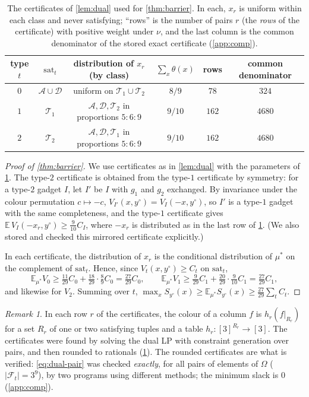 \documentclass[11pt,letterpaper]{article}
\theoremstyle{remark}
\newtheorem{remark}[theorem]{Remark}
\newcommand{\sat}{\mathrm{sat}}
\newcommand{\yc}{y^{\circ}}
\begin{document}
\begin{table}[t]
\centering\small
\begin{tabular}{@{}cccccc@{}}
\toprule
type $t$ & $\sat_t$ & distribution of $x_r$ (by class) & $\sum_x\theta(x)$ & rows & common denominator\\
\midrule
$0$ & $\mathcal A\cup\mathcal D$ & uniform on $\mathcal T_1\cup\mathcal T_2$ & $8/9$ & $78$ & $324$\\
$1$ & $\mathcal T_1$ & $\mathcal A,\mathcal D,\mathcal T_2$ in proportions $5:6:9$ & $9/10$ & $162$ & $4680$\\
$2$ & $\mathcal T_2$ & $\mathcal A,\mathcal D,\mathcal T_1$ in proportions $5:6:9$ & $9/10$ & $162$ & $4680$\\
\bottomrule
\end{tabular}
\caption{The certificates of \cref{lem:dual} used for \cref{thm:barrier}. In each, $x_r$ is uniform within
each class and never satisfying; ``rows'' is the number of pairs $r$ (the \emph{rows} of the certificate) with positive weight under $\nu$, and the last column is
the common denominator of the stored exact certificate (\cref{app:comp}).}
\label{tab:certs}
\end{table}

\begin{proof}[Proof of \cref{thm:barrier}]
We use certificates as in \cref{lem:dual} with the parameters of \cref{tab:certs}. The type-$2$
certificate is obtained from the type-$1$ certificate by symmetry: for a type-$2$ gadget $I$, let $I'$ be
$I$ with $g_1$ and $g_2$ exchanged. By invariance under the colour permutation $c\mapsto-c$,
$V_{I'}(x,\yc)=V_I(-x,\yc)$, so $I'$ is a type-$1$ gadget with the same completeness, and the type-$1$
certificate gives $\mathbb E\,V_I(-x_r,\yc)\ge\frac9{10}C_I$, where $-x_r$ is distributed as in the last row
of \cref{tab:certs}. (We also stored and checked this mirrored certificate explicitly.)

In each certificate, the distribution of $x_r$ is the conditional distribution of $\mu^\ast$ on the
complement of $\sat_t$. Hence, since $V_t(x,\yc)\ge C_t$ on $\sat_t$,
\[
\mathbb E_{\mu^\ast}V_0\ge\tfrac{11}{29}C_0+\tfrac{18}{29}\cdot\tfrac89C_0=\tfrac{27}{29}C_0,\qquad
\mathbb E_{\mu^\ast}V_1\ge\tfrac{9}{29}C_1+\tfrac{20}{29}\cdot\tfrac9{10}C_1=\tfrac{27}{29}C_1,
\]
and likewise for $V_2$. Summing over $t$, $\max_xS_{\yc}(x)\ge\mathbb E_{\mu^\ast}S_{\yc}(x)
\ge\frac{27}{29}\sum_tC_t$.
\end{proof}

\begin{remark}
In each row $r$ of the certificates, the colour of a column $f$ is $h_r(f|_{R_r})$ for a set $R_r$ of one
or two satisfying tuples and a table $h_r\colon[3]^{R_r}\to[3]$. The certificates were found by solving
the dual LP with constraint generation over pairs, and then rounded to rationals (\cref{tab:certs}). The
rounded certificates are what is verified: \eqref{eq:dual-pair} was checked \emph{exactly}, for all pairs
of elements of $\Omega$ ($|\mathcal F_t|=3^9$), by two programs using different methods; the minimum slack
is $0$ (\cref{app:comp}).
\end{remark}
\end{document}
